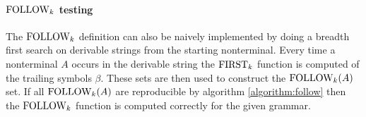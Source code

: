 \paragraph{\texorpdfstring{$\text{FOLLOW}_k$}{TEXT} testing}
The $\text{FOLLOW}_k$ definition can also be naively implemented by doing a breadth first search on derivable strings from the starting nonterminal. Every time a nonterminal $A$ occurs in the derivable string the $\text{FIRST}_k$ function is computed of the trailing symbols $\beta$. These sets are then used to construct the $\text{FOLLOW}_k(A)$ set. If all $\text{FOLLOW}_k(A)$ are reproducible by algorithm \ref{algorithm:follow} then the $\text{FOLLOW}_k$ function is computed correctly for the given grammar.

